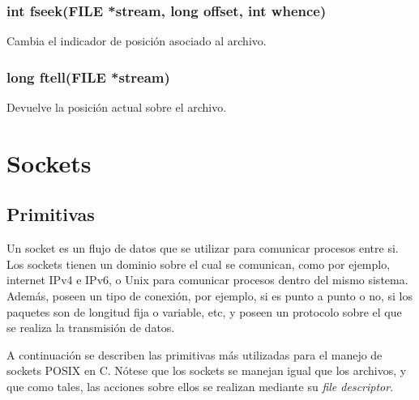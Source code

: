 \documentclass[oneside]{article}
\begin{document}
		\subsubsection {int fseek(FILE *stream, long offset, int whence)}
		Cambia el indicador de posición asociado al archivo.\\

		\subsubsection {long ftell(FILE *stream)}
		Devuelve la posición actual sobre el archivo.
\pagebreak
	\section{Sockets}
		\subsection{Primitivas}
		Un socket es un flujo de datos que se utilizar para comunicar procesos entre si. Los sockets tienen un dominio sobre el cual se comunican, como por ejemplo, internet IPv4 e IPv6, o Unix para comunicar procesos dentro del mismo sistema. Además, poseen un tipo de conexión, por ejemplo, si es punto a punto o no, si los paquetes son de longitud fija o variable, etc, y poseen un protocolo sobre el que se realiza la transmisión de datos.
		
		
		A continuación se describen las primitivas más utilizadas para el manejo de sockets POSIX en C. Nótese que los sockets se manejan igual que los archivos, y que como tales, las acciones sobre ellos se realizan mediante su \emph{file descriptor}.
	
\end{document}
